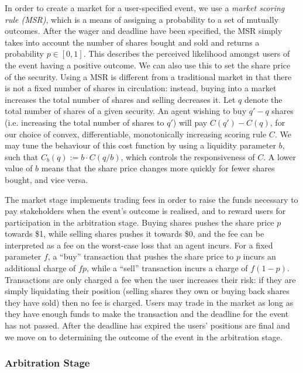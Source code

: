 In order to create a market for a user-specified event, we use a \emph{market
scoring rule (MSR)}, which is a means of assigning a probability to a set of
mutually outcomes. After the wager and deadline have been specified, the MSR
simply takes into account the number of shares bought and sold and returns a
probability $p \in [0,1]$. This describes the perceived likelihood amongst
users of the event having a positive outcome. We can also use this to set the
share price of the security.  Using a MSR is different from a traditional
market in that there is not a fixed number of shares in circulation: instead,
buying into a market increases the total number of shares and selling decreases
it. Let $q$ denote the total number of shares of a given security. An agent
wishing to buy $q'-q$ shares (i.e. increasing the total number of shares to
$q'$) will pay $C(q')-C(q)$, for our choice of convex, differentiable,
monotonically increasing scoring rule $C$. We may tune the behaviour of this
cost function by using a liquidity parameter $b$, such that $C_b(q) := b \cdot
C(q/b)$, which controls the responsiveness of $C$. A lower value of $b$ means
that the share price changes more quickly for fewer shares bought, and vice
versa.

The market stage implements trading fees in order to raise the funds necessary
to pay stakeholders when the event's outcome is realised, and to reward users
for participation in the arbitration stage. Buying shares pushes the share
price $p$ towards \$1, while selling shares pushes it towards \$0, and the fee
can be interpreted as a fee on the worst-case loss that an agent incurs. For a
fixed parameter $f$, a ``buy'' transaction that pushes the share price to $p$
incurs an additional charge of $fp$, while a ``sell'' transaction incurs a
charge of $f(1-p)$. Transactions are only charged a fee when the user increases
their risk: if they are simply liquidating their position (selling shares they
own or buying back shares they have sold) then no fee is charged.  Users may
trade in the market as long as they have enough funds to make the transaction
and the deadline for the event has not passed. After the deadline has expired
the users' positions are final and we move on to determining the outcome of the
event in the arbitration stage.

\subsubsection{Arbitration Stage}

